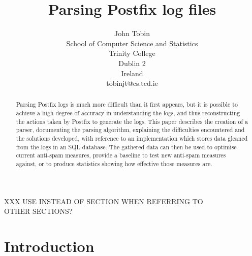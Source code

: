 \documentclass[a4paper,12pt,draft]{article}
\newcounter{dummy}
\begin{document}


\title{Parsing Postfix log files}
\author{John Tobin \\ School of Computer Science and Statistics \\
Trinity College \\ Dublin 2 \\ Ireland \\ tobinjt@cs.tcd.ie}
\maketitle

\begin{abstract}

    Parsing Postfix logs is much more difficult than it first appears, but
    it is possible to achieve a high degree of accuracy in understanding
    the logs, and thus reconstructing the actions taken by Postfix to
    generate the logs.  This paper describes the creation of a parser,
    documenting the parsing algorithm, explaining the difficulties
    encountered and the solutions developed, with reference to an
    implementation which stores data gleaned from the logs in an SQL
    database.  The gathered data can then be used to optimise current
    anti-spam measures, provide a baseline to test new anti-spam measures
    against, or to produce statistics showing how effective those measures
    are.

\end{abstract}

XXX USE \textsection{} INSTEAD OF SECTION WHEN REFERRING TO \\OTHER
SECTIONS\@?

\newpage
\tableofcontents
\listoffigures
\listoftables

\newpage
\section{Introduction}

\label{introduction}
\end{document}
